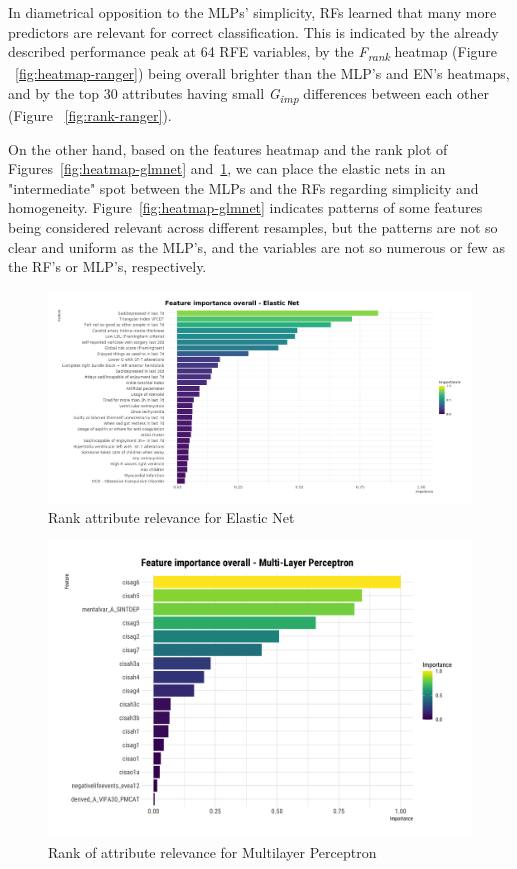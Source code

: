 In diametrical opposition to the MLPs' simplicity, RFs learned that many more predictors are relevant for correct classification.
This is indicated by the already described performance peak at 64 RFE variables, by the \textit{F\textsubscript{rank}} heatmap (Figure ~\ref{fig:heatmap-ranger}) being overall brighter than the MLP's and EN's heatmaps, and by the top 30 attributes having small \textit{G\textsubscript{imp}} differences between each other (Figure ~\ref{fig:rank-ranger}).

On the other hand, based on the features heatmap and the rank plot of Figures~\ref{fig:heatmap-glmnet} and~\ref{fig:rank-glmnet}, we can place the elastic nets in an "intermediate" spot between the MLPs and the RFs regarding simplicity and homogeneity.
Figure~\ref{fig:heatmap-glmnet} indicates patterns of some features being considered relevant across different resamples, but the patterns are not so clear and uniform as the MLP's, and the variables are not so numerous or few as the RF's or MLP's, respectively.

\begin{figure}[H]
    \caption{Rank attribute relevance for Elastic Net}
    \centerline{\includegraphics[scale=.21]{../reports/results/models_and_evals/summary/var_imp_glmnet.png}}
    \label{fig:rank-glmnet}
\end{figure}

\begin{figure}[H]
    \caption{Rank of attribute relevance for Multilayer Perceptron}
    \centerline{\includegraphics[scale=.21]{../reports/results/models_and_evals/summary/var_imp_mlpML.png}}
    \label{fig:rank-mlp}
\end{figure}

